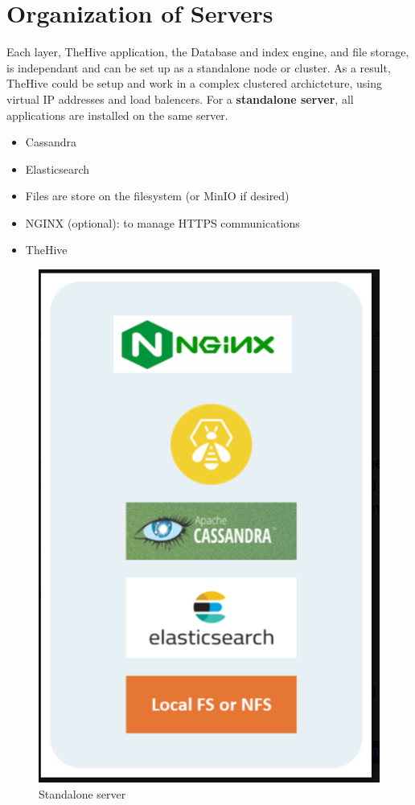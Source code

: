 \documentclass{book}
\begin{document}
\section{Organization of Servers}
Each layer, TheHive application, the Database and  index engine, and file storage, is independant and can be set up as a standalone node or cluster. As a result, TheHive could be setup and work in a complex clustered archicteture, using virtual IP addresses and load balencers.
For a \textbf{standalone server}, all applications are installed on the same server.
\begin{itemize}
    \item Cassandra
    \item Elasticsearch
    \item Files are store on the filesystem (or MinIO if desired)
    \item NGINX (optional): to manage HTTPS communications
    \item TheHive
\end{itemize}
\begin{figure}[h]
    \centering
    \includegraphics[scale=0.35]{Introductory Images/standalone server.png}
    \caption{Standalone server}
    \label{fig:standaloneserver}
\end{figure}
\end{document}
